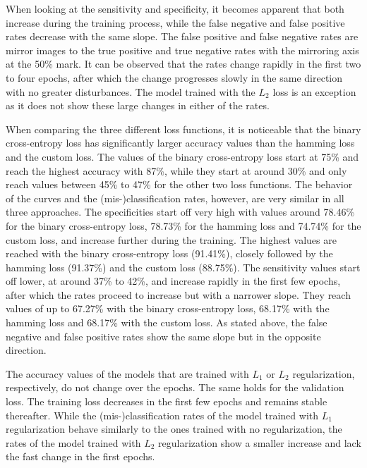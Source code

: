 When looking at the sensitivity and specificity, it becomes apparent that both increase during the training process, while the false negative and false positive rates decrease with the same slope. The false positive and false negative rates are mirror images to the true positive and true negative rates with the mirroring axis at the 50\% mark. It can be observed that the rates change rapidly in the first two to four epochs, after which the change progresses slowly in the same direction with no greater disturbances. The model trained with the \(L_2\) loss is an exception as it does not show these large changes in either of the rates.

\bigskip
When comparing the three different loss functions, it is noticeable that the binary cross-entropy loss has significantly larger accuracy values than the hamming loss and the custom loss. The values of the binary cross-entropy loss start at 75\% and reach the highest accuracy with 87\%, while they start at around 30\% and only reach values between 45\% to 47\% for the other two loss functions. The behavior of the curves and the (mis-)classification rates, however, are very similar in all three approaches. The specificities start off very high with values around 78.46\% for the binary cross-entropy loss, 78.73\% for the hamming loss and 74.74\% for the custom loss, and increase further during the training. The highest values are reached with the binary cross-entropy loss (91.41\%), closely followed by the hamming loss (91.37\%) and the custom loss (88.75\%). The sensitivity values start off lower, at around 37\% to 42\%, and increase rapidly in the first few epochs, after which the rates proceed to increase but with a narrower slope. They reach values of up to 67.27\% with the binary cross-entropy loss, 68.17\% with the hamming loss and 68.17\% with the custom loss. As stated above, the false negative and false positive rates show the same slope but in the opposite direction.

The accuracy values of the models that are trained with \(L_1\) or \(L_2\) regularization, respectively, do not change over the epochs. The same holds for the validation loss. The training loss decreases in the first few epochs and remains stable thereafter.
While the (mis-)classification rates of the model trained with \(L_1\) regularization behave similarly to the ones trained with no regularization, the rates of the model trained with \(L_2\) regularization show a smaller increase and lack the fast change in the first epochs.

